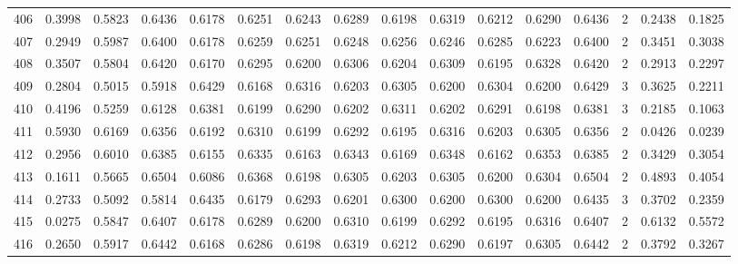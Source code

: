 \begin{tabular}{lrrrrrrrrrrrrrrr}
406 &      0.3998 &  0.5823 &  0.6436 &  0.6178 &  0.6251 &  0.6243 &  0.6289 &  0.6198 &  0.6319 &  0.6212 &   0.6290 &     0.6436 &      2 &                    0.2438 &                     0.1825 \\
407 &      0.2949 &  0.5987 &  0.6400 &  0.6178 &  0.6259 &  0.6251 &  0.6248 &  0.6256 &  0.6246 &  0.6285 &   0.6223 &     0.6400 &      2 &                    0.3451 &                     0.3038 \\
408 &      0.3507 &  0.5804 &  0.6420 &  0.6170 &  0.6295 &  0.6200 &  0.6306 &  0.6204 &  0.6309 &  0.6195 &   0.6328 &     0.6420 &      2 &                    0.2913 &                     0.2297 \\
409 &      0.2804 &  0.5015 &  0.5918 &  0.6429 &  0.6168 &  0.6316 &  0.6203 &  0.6305 &  0.6200 &  0.6304 &   0.6200 &     0.6429 &      3 &                    0.3625 &                     0.2211 \\
410 &      0.4196 &  0.5259 &  0.6128 &  0.6381 &  0.6199 &  0.6290 &  0.6202 &  0.6311 &  0.6202 &  0.6291 &   0.6198 &     0.6381 &      3 &                    0.2185 &                     0.1063 \\
411 &      0.5930 &  0.6169 &  0.6356 &  0.6192 &  0.6310 &  0.6199 &  0.6292 &  0.6195 &  0.6316 &  0.6203 &   0.6305 &     0.6356 &      2 &                    0.0426 &                     0.0239 \\
412 &      0.2956 &  0.6010 &  0.6385 &  0.6155 &  0.6335 &  0.6163 &  0.6343 &  0.6169 &  0.6348 &  0.6162 &   0.6353 &     0.6385 &      2 &                    0.3429 &                     0.3054 \\
413 &      0.1611 &  0.5665 &  0.6504 &  0.6086 &  0.6368 &  0.6198 &  0.6305 &  0.6203 &  0.6305 &  0.6200 &   0.6304 &     0.6504 &      2 &                    0.4893 &                     0.4054 \\
414 &      0.2733 &  0.5092 &  0.5814 &  0.6435 &  0.6179 &  0.6293 &  0.6201 &  0.6300 &  0.6200 &  0.6300 &   0.6200 &     0.6435 &      3 &                    0.3702 &                     0.2359 \\
415 &      0.0275 &  0.5847 &  0.6407 &  0.6178 &  0.6289 &  0.6200 &  0.6310 &  0.6199 &  0.6292 &  0.6195 &   0.6316 &     0.6407 &      2 &                    0.6132 &                     0.5572 \\
416 &      0.2650 &  0.5917 &  0.6442 &  0.6168 &  0.6286 &  0.6198 &  0.6319 &  0.6212 &  0.6290 &  0.6197 &   0.6305 &     0.6442 &      2 &                    0.3792 &                     0.3267 \\

\end{tabular}
